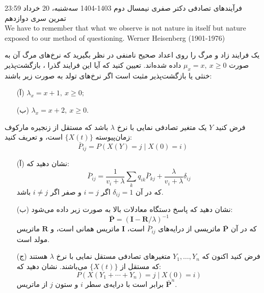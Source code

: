 \documentclass[11pt, a4, twoside]{article}
\begin{document}
	\pagestyle{empty}
	\heading
	{فرآیندهای تصادفی}
	{دکتر صفری}
	{نیمسال دوم 1403-1404}
    {سه‌شنبه، 20 خرداد 23:59}
    {تمرین سری دوازدهم}
	\inspiringQuotation
	{\\We have to remember that what we observe is not nature in itself but nature exposed to our method of questioning.}
	{Werner Heisenberg (1901-1976)}
	\begin{problem}
		یک فرایند زاد و مرگ را روی اعداد صحیح نامنفی در نظر بگیرید که نرخ‌های مرگ آن به صورت $\mu_x = x,\ x \geq 0$ داده شده‌اند. تعیین کنید که آیا این فرایند گذرا ، بازگشت‌پذیر خنثی  یا بازگشت‌پذیر مثبت  است اگر نرخ‌های تولد به صورت زیر باشند:

		\begin{itemize}
		\item[(آ)] $\lambda_x = x + 1,\ x \geq 0;$
		\item[(ب)] $\lambda_x = x + 2,\ x \geq 0.$
		\end{itemize}
	\end{problem}

	\begin{problem}
		فرض کنید $Y$ یک متغیر تصادفی نمایی با نرخ $\lambda$ باشد که مستقل از زنجیره مارکوف زمان‌پیوسته $\{X(t)\}$ است، و تعریف کنید:
		\[
		\bar{P}_{ij} = P(X(Y) = j \mid X(0) = i)
		\]

		\begin{itemize}
		\item[(آ)] نشان دهید که:
		\[
		\bar{P}_{ij} = \frac{1}{v_i + \lambda} \sum_k q_{ik} \bar{P}_{kj} + \frac{\lambda}{v_i + \lambda} \delta_{ij}
		\]
		که در آن $\delta_{ij} = 1$ اگر $i = j$ و صفر اگر $i \ne j$ باشد.

		\item[(ب)] نشان دهید که پاسخ دستگاه معادلات بالا به صورت زیر داده می‌شود:
		\[
		\bar{\mathbf{P}} = (\mathbf{I} - \mathbf{R}/\lambda)^{-1}
		\]
		که در آن $\bar{\mathbf{P}}$ ماتریسی از درایه‌های $\bar{P}_{ij}$ است، $\mathbf{I}$ ماتریس همانی است، و $\mathbf{R}$ ماتریس مولد است.

		\item[(ج)] فرض کنید اکنون که $Y_1, \ldots, Y_n$ متغیرهای تصادفی مستقل نمایی با نرخ $\lambda$ هستند که مستقل از $\{X(t)\}$ می‌باشند. نشان دهید که:
		\[
		P(X(Y_1 + \cdots + Y_n) = j \mid X(0) = i)
		\]
		برابر است با درایه‌ی سطر $i$ و ستون $j$ از ماتریس $\bar{\mathbf{P}}^n$.
		\end{itemize}
	\end{problem}
\end{document}
